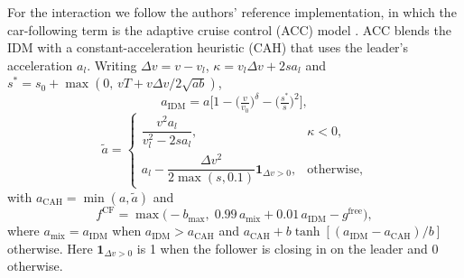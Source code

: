 \documentclass[11pt]{article}
\begin{document}
For the interaction we follow the authors' reference implementation, in which
the car-following term is the adaptive cruise control (ACC) model \cite{acc}.
ACC blends the IDM with a constant-acceleration heuristic (CAH) that uses the
leader's acceleration $a_l$. Writing $\Delta v=v-v_l$,
$\kappa=v_l\Delta v+2sa_l$ and $s^{*}=s_0+\max(0,\,vT+v\Delta v/2\sqrt{ab})$,
\begin{equation}
a_{\mathrm{IDM}}=a\Big[1-\big(\tfrac{v}{v_0}\big)^{\delta}-\big(\tfrac{s^{*}}{s}\big)^{2}\Big],
\label{eq:idm}
\end{equation}
\begin{equation}
\tilde a=\begin{cases}\dfrac{v^{2}a_l}{v_l^{2}-2sa_l}, & \kappa<0,\\[6pt]
a_l-\dfrac{\Delta v^{2}}{2\max(s,0.1)}\mathbf{1}_{\Delta v>0}, & \text{otherwise,}\end{cases}
\end{equation}
with $a_{\mathrm{CAH}}=\min(a,\tilde a)$ and
\begin{equation}
f^{\mathrm{CF}}=\max\!\big(-b_{\max},\;0.99\,a_{\mathrm{mix}}+0.01\,a_{\mathrm{IDM}}-g^{\mathrm{free}}\big),
\label{eq:acc}
\end{equation}
where $a_{\mathrm{mix}}=a_{\mathrm{IDM}}$ when $a_{\mathrm{IDM}}>a_{\mathrm{CAH}}$
and $a_{\mathrm{CAH}}+b\tanh[(a_{\mathrm{IDM}}-a_{\mathrm{CAH}})/b]$ otherwise.
Here $\mathbf{1}_{\Delta v>0}$ is 1 when the follower is closing in on the
leader and 0 otherwise.
\end{document}
